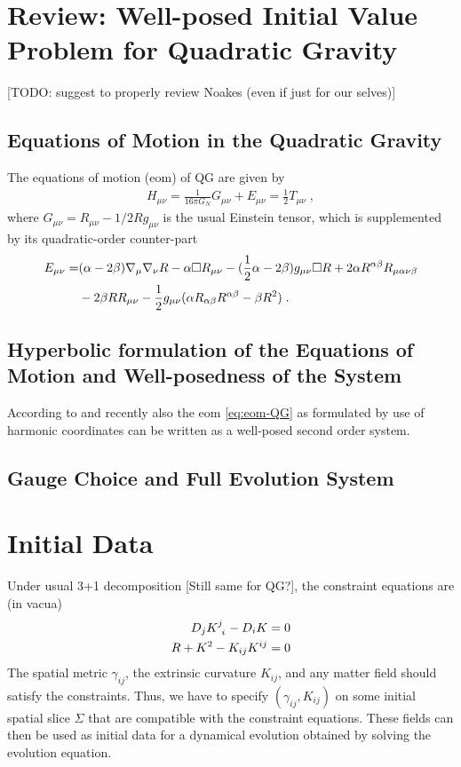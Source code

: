 \documentclass[a4paper,oneside,openany,11pt]{memoir}
\numberwithin{equation}{section} %
\newcommand{\TODO}[1]{{\color{red}[}{\color{red}TODO:} {\color{blue}#1}{\color{red}]}}
\newcommand{\NOTE}[1]{{\color{blue}[#1]}}
\begin{document}
\section{Review: Well-posed Initial Value Problem for Quadratic Gravity}
\label{sec:well-posedness}
\TODO{suggest to properly review Noakes (even if just for our selves)}

\subsection{Equations of Motion in the Quadratic Gravity}

The equations of motion (eom) of QG are given by
\begin{align}
\label{eq:eom-QG}
	H_{\mu\nu}=\frac{1}{16 \pi G_N} G_{\mu\nu} + E_{\mu\nu}=\frac{1}{2}T_{\mu\nu}\;,
\end{align}
where $G_{\mu\nu} = R_{\mu\nu} -1/2 R g_{\mu\nu}$ is the usual Einstein tensor, which is supplemented by its quadratic-order counter-part
\begin{align}
	E_{\mu\nu} = &(\alpha-2\beta)\nabla_\mu\nabla_\nu R-\alpha \square R_{\mu\nu}-(\frac{1}{2}\alpha-2\beta)g_{\mu\nu}\square R
+2\alpha R^{\alpha\beta}R_{\mu\alpha\nu\beta}
	\notag\\
	&-2\beta R R_{\mu\nu}-\frac{1}{2}g_{\mu\nu}(\alpha R_{\alpha\beta}R^{\alpha\beta}-\beta R^2)\;.
\end{align}

\subsection{Hyperbolic formulation of the Equations of Motion and Well-posedness of the System}

According to \cite{Noakes:1983} and recently also \cite{Morales:2018imi} the eom \eqref{eq:eom-QG} as formulated by use of harmonic coordinates can be written as a well-posed second order system.

\subsection{Gauge Choice and Full Evolution System}

\section{Initial Data}
Under usual 3+1 decomposition \NOTE{Still same for QG?}, the constraint equations are (in vacua)
\begin{align}
D_j K\indices{^j_i} - D_i K &= 0 \\
R + K^2 - K_{ij} K^{ij} &= 0
\end{align}
The spatial metric $\gamma_{ij}$, the extrinsic curvature $K_{ij}$, and any matter field should 
satisfy the constraints. Thus, we have to specify $(\gamma_{ij}, K_{ij})$ on some initial 
spatial slice $\Sigma$ that are compatible with the constraint equations. These fields can 
then be used as initial data for a dynamical evolution obtained by solving the evolution equation.
\end{document}
